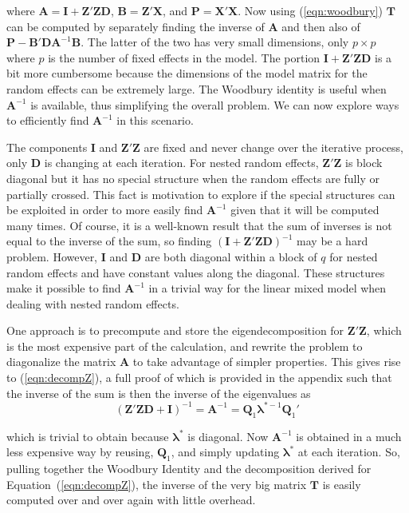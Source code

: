 \documentclass[12pt]{article}
\begin{document}
\noindent where $\bm{A} = \bm{I} +  \bm{Z}'\bm{Z}\bm{D}$, $\bm{B} = \bm{Z}'\bm{X}$, and $\bm{P} = \bm{X}'\bm{X}$. Now using (\ref{eqn:woodbury}) $\bm{T}$ can be computed by separately finding the inverse of $\bm{A}$ and then also of $\bm{P} - \bm{B}'\bm{D}\bm{A}^{-1}\bm{B}$. The latter of the two has very small dimensions, only $p \times p$ where $p$ is the number of fixed effects in the model. The portion $\bm{I} + \bm{Z}'\bm{Z}\bm{D}$ is a bit more cumbersome because the dimensions of the model matrix for the random effects can be extremely large. The Woodbury identity is useful when $\bm{A}^{-1}$ is available, thus simplifying the overall problem. We can now explore ways to efficiently find $\bm{A}^{-1}$ in this scenario.

The components $\bm{I}$ and $\bm{Z}'\bm{Z}$ are fixed and never change over the iterative process, only $\bm{D}$ is changing at each iteration. For nested random effects, $\bm{Z}'\bm{Z}$ is block diagonal but it has no special structure when the random effects are fully or partially crossed. This fact is motivation to explore if the special structures can be exploited in order to more easily find $\bm{A}^{-1}$ given that it will be computed many times. Of course, it is a well-known result that the sum of inverses is not equal to the inverse of the sum, so finding $(\bm{I} +  \bm{Z}'\bm{Z}\bm{D})^{-1}$ may be a hard problem. However, $\bm{I}$ and $\bm{D}$ are both diagonal within a block of $q$ for nested random effects and have constant values along the diagonal. These structures make it possible to find $\bm{A}^{-1}$ in a trivial way for the linear mixed model when dealing with nested random effects. 

One approach is to precompute and store the eigendecomposition for $\bm{Z}'\bm{Z}$, which is the most expensive part of the calculation, and rewrite the problem to diagonalize the matrix $\bm{A}$ to take advantage of simpler properties. This gives rise to (\ref{eqn:decompZ}), a full proof of which is provided in the appendix such that the inverse of the sum is then the inverse of the eigenvalues as  
\begin{equation}
\label{eqn:decompZ}
(\bm{Z}'\bm{Z}\bm{D} + \bm{I})^{-1} = \bm{A}^{-1} = \bm{Q}_1 \bm{\lambda}^{*-1} \bm{Q}_1'
\end{equation}

\noindent which is trivial to obtain because $\bm{\lambda}^{*}$ is diagonal.  Now $\bm{A}^{-1}$ is obtained in a much less expensive way by reusing, $\bm{Q}_1$, and simply updating $\bm{\lambda}^*$ at each iteration. So, pulling together the Woodbury Identity and the decomposition derived for Equation~(\ref{eqn:decompZ}), the inverse of the very big matrix $\bm{T}$ is easily computed over and over again with little overhead.
\end{document}
